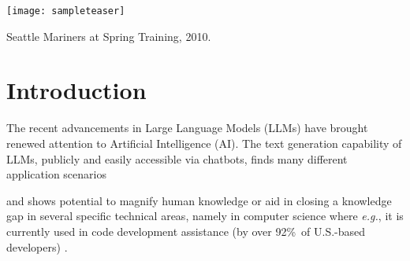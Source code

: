 \documentclass[sigconf]{acmart}
\begin{document}

\begin{teaserfigure}
  \texttt{[image: sampleteaser]}
  \caption{Seattle Mariners at Spring Training, 2010.}
  \label{fig:teaser}
\end{teaserfigure}


\maketitle

\section{Introduction}
The recent advancements in Large Language Models (LLMs) have
brought renewed attention to Artificial Intelligence (AI). The text
generation capability of LLMs, publicly and easily accessible via
chatbots, finds many different application scenarios \cite{Kaddour23, Okonkwo21, Reis20}

and
shows potential to magnify human knowledge or aid in closing a
knowledge gap in several specific technical areas, namely in computer science where {\itshape e.g.}, it is currently used in code development
assistance (by over 92\%\ of U.S.-based developers) \cite{Shani23}.
\end{document}
